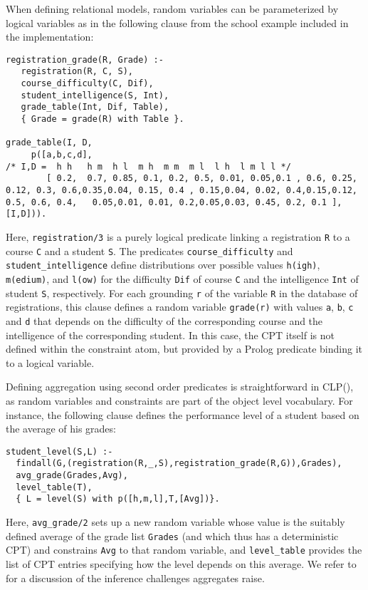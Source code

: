 \documentclass[a4paper]{article}
\newcommand{\clpbn}
  {CLP()}
\begin{document}
When defining relational models, random variables can be parameterized
by logical variables as in the following clause from the school example
included in the implementation: 
\begin{verbatim}
registration_grade(R, Grade) :-
   registration(R, C, S),
   course_difficulty(C, Dif),
   student_intelligence(S, Int),
   grade_table(Int, Dif, Table),
   { Grade = grade(R) with Table }.

grade_table(I, D, 
     p([a,b,c,d],
/* I,D =  h h   h m  h l  m h  m m  m l  l h  l m l l */
        [ 0.2,  0.7, 0.85, 0.1, 0.2, 0.5, 0.01, 0.05,0.1 , 0.6, 0.25, 0.12, 0.3, 0.6,0.35,0.04, 0.15, 0.4 , 0.15,0.04, 0.02, 0.4,0.15,0.12, 0.5, 0.6, 0.4,   0.05,0.01, 0.01, 0.2,0.05,0.03, 0.45, 0.2, 0.1 ],[I,D])).
\end{verbatim}
Here, \texttt{registration/3} is a purely logical predicate
linking a registration \verb|R| to a course \verb|C| and a
student \verb|S|.  The predicates \texttt{course\_difficulty} and
\texttt{student\_intelligence} define distributions over possible
values \texttt{h(igh)}, \texttt{m(edium)}, and \texttt{l(ow)} for the
difficulty \texttt{Dif} of course \verb|C| and the intelligence 
\texttt{Int} of student \verb|S|, respectively. For each grounding \verb|r| of the variable
\verb|R| in the database of registrations, this clause defines a random
variable \verb|grade(r)| with values \verb|a|, \verb|b|, \verb|c| and \verb|d| that depends on the difficulty of the
corresponding course and the intelligence of the corresponding
student. In this case, the CPT itself is not defined within the
constraint atom, but provided by a Prolog predicate binding it to a
logical variable. 

Defining aggregation using second order predicates is straightforward
in \clpbn, as random variables
and constraints are part of the object level vocabulary. For instance,
the following clause defines the performance level of a student based
on the average of his grades:
\begin{verbatim}
student_level(S,L) :-
  findall(G,(registration(R,_,S),registration_grade(R,G)),Grades),
  avg_grade(Grades,Avg),
  level_table(T),
  { L = level(S) with p([h,m,l],T,[Avg])}.
\end{verbatim}
Here, \verb|avg_grade/2| sets up a new random variable
whose value is the suitably defined average of the grade list \verb|Grades| (and
which thus has a deterministic CPT) and constrains \verb|Avg| to that
random variable, and \verb|level_table| provides the 
list of CPT
entries specifying how the level depends on this average. We refer to
\cite{clpbn} for a discussion of the inference challenges aggregates
raise.   
\end{document}
